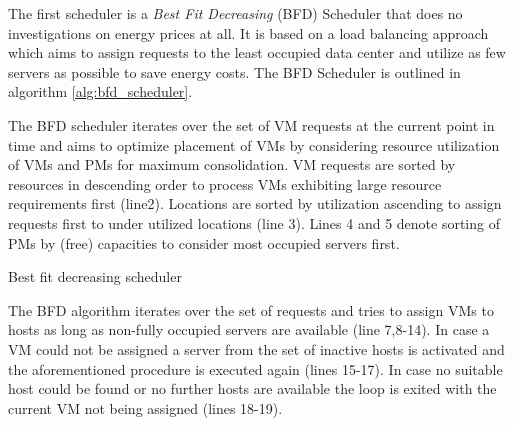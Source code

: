 The first scheduler is a \textit{Best Fit Decreasing} (BFD) Scheduler that does no investigations on energy prices at all. It is based on a load balancing approach which aims to assign requests to the least occupied data center and utilize as few servers as possible to save energy costs. The BFD Scheduler is outlined in algorithm \ref{alg:bfd_scheduler}. 

The BFD scheduler iterates over the set of VM requests at the current point in time and aims to optimize placement of VMs by considering resource utilization of VMs and PMs for maximum consolidation. VM requests are sorted by resources in descending order to process VMs exhibiting large resource requirements first (line2). Locations are sorted by utilization ascending to assign requests first to under utilized locations (line 3). Lines 4 and 5 denote sorting of PMs by (free) capacities to consider most occupied servers first. 

\begin{algorithm}[htpb]
	\SetAlgoLined
\caption{Best fit decreasing scheduler}
\label{alg:bfd_scheduler}
\end{algorithm}

The BFD algorithm iterates over the set of requests and tries to assign VMs to hosts as long as non-fully occupied servers are available (line 7,8-14). In case a VM could not be assigned a server from the set of inactive hosts is activated and the aforementioned procedure is executed again (lines 15-17). In case no suitable host could be found or no further hosts are available the loop is exited with the current VM not being assigned (lines 18-19). 

